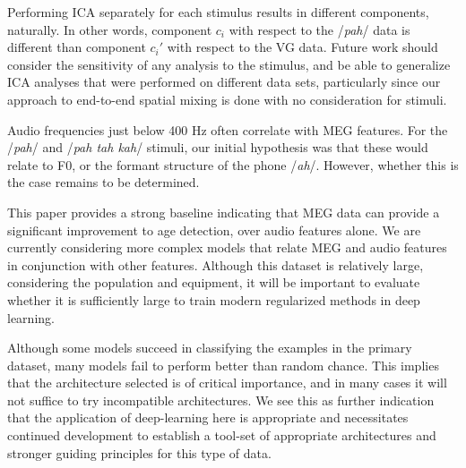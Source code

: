 \documentclass[utf8]{frontiersSCNS} %
\begin{document}
Performing ICA separately for each stimulus results in different components, naturally. In other words, component $c_i$ with respect to the /{\em pah}/ data is different than component $c_i'$ with respect to the VG data. Future work should consider the sensitivity of any analysis to the stimulus, and be able to generalize ICA analyses that were performed on different data sets, particularly since our approach to end-to-end spatial mixing is done with no consideration for stimuli.

Audio frequencies just below 400 Hz often correlate with MEG features. For the /{\em pah}/ and /{\em pah tah kah}/ stimuli, our initial hypothesis was that these would relate to F0, or the formant structure of the phone /{\em ah}/. However, whether this is the case remains to be determined.

This paper provides a strong baseline indicating that MEG data can provide a significant improvement to age detection, over audio features alone. We are currently considering more complex models that relate MEG and audio features in conjunction with other features. Although this dataset is relatively large, considering the population and equipment, it will be important to evaluate whether it is sufficiently large to train modern regularized methods in deep learning.


Although some models succeed in classifying the examples in the primary dataset, many models fail to perform better than random chance. This implies that the architecture selected is of critical importance, and in many cases it will not suffice to try incompatible architectures. We see this as further indication that the application of deep-learning here is appropriate and necessitates continued development to establish a tool-set of appropriate architectures and stronger guiding principles for this type of data.


\end{document}
